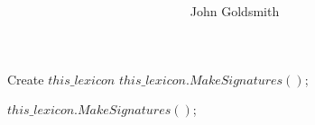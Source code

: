 \documentclass[a4paper,10pt]{article}
\title{ }
\author{John Goldsmith}
\begin{document}
\maketitle

\tableofcontents

\begin{algorithm}
\begin{algorithmic}[1]
\STATE Create $this\_lexicon$
\STATE $this\_lexicon.MakeSignatures()$;
 

\end{algorithmic}
\end{algorithm}
 




\begin{algorithm}

\begin{algorithmic}[1]
 
 
\STATE $this\_lexicon.MakeSignatures()$;
\end{algorithmic}
\end{algorithm}
\end{document}
